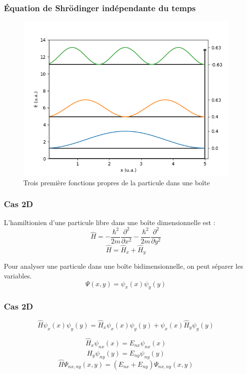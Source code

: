 \documentclass[aspectratio=169]{beamer}
\begin{document}
\begin{frame}
\frametitle{Équation de Shrödinger indépendante du temps}
\begin{figure}[h]
\includegraphics[scale=0.5]{den_propre}
\caption{Trois première fonctions propres de la particule dans une boîte}
\end{figure}

\end{frame}



\begin{frame}
\frametitle{Cas 2D}
L'hamiltionien d'une particule libre dans une boîte dimensionnelle est :
\begin{equation}
\hat{H}=-\frac{\hbar^2}{2m}\frac{\partial^2}{\partial x^2}-\frac{\hbar^2}{2m}\frac{\partial^2}{\partial y^2}
\end{equation}
\begin{equation}
\hat{H}=\hat{H}_x+\hat{H}_y
\end{equation}


Pour analyser une particule dans une boîte bidimensionnelle, on peut séparer les variables. 
\begin{equation}
\Psi(x,y)=\psi_x(x)\psi_y(y)
\end{equation}
\end{frame}


\begin{frame}
\frametitle{Cas 2D}
\begin{equation}
\hat{H}\psi_x(x)\psi_y(y)=\hat{H}_x\psi_x(x)\psi_y(y)+\psi_x(x)\hat{H}_y\psi_y(y)
\end{equation}

\begin{equation}
\hat{H}_x\psi_{nx}(x)=E_{nx}\psi_{nx}(x)
\end{equation}
\begin{equation}
\hat{H}_y\psi_{ny}(y)=E_{ny}\psi_{ny}(y)
\end{equation}
\begin{equation}
\hat{H}\Psi_{nx,ny}(x,y)=\left(E_{nx}+E_{ny}\right)\Psi_{nx,ny}(x,y)
\end{equation}
\end{frame}
\end{document}
